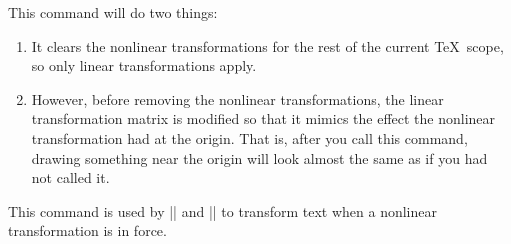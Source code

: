 \begin{command}{\pgfapproximatenonlineartransformation}
  This command will do two things:
  \begin{enumerate}
  \item It clears the nonlinear transformations for the rest of the
    current \TeX\ scope, so only linear transformations apply.
  \item However, before removing the nonlinear transformations, the
    linear transformation matrix is modified so that it mimics the
    effect the nonlinear transformation had at the origin. That is,
    after you call this command, drawing something near the origin
    will look almost the same as if you had not called it.
  \end{enumerate}

\begin{codeexample}[]
\end{codeexample}  
  This command is used by |\pgftext| and |\pgfnode| to transform text
  when a nonlinear transformation is in force.
\end{command}

